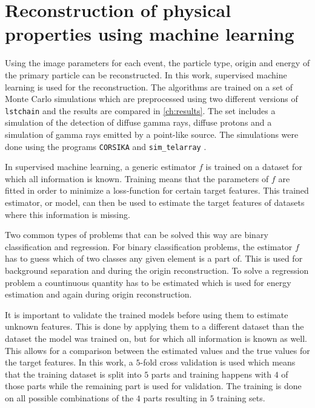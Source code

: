 \chapter{Reconstruction of physical properties using machine learning}
\label{ch:ml}
Using the image parameters for each event, the particle type, origin and energy of the primary particle can be reconstructed.
In this work, supervised machine learning is used for the reconstruction.
The algorithms are trained on a set of Monte Carlo simulations which are preprocessed using two different versions of \texttt{lstchain} 
and the results are compared in \autoref{ch:results}.
The set includes a simulation of the detection of diffuse gamma rays, diffuse protons and a simulation of gamma rays emitted by a point-like source.
The simulations were done using the programs \texttt{CORSIKA} and \texttt{sim\_telarray} \cite{simulations}.

In supervised machine learning, a generic estimator $f$ is trained on a dataset for which all information is known.
Training means that the parameters of $f$ are fitted in order to minimize a loss-function for certain target features.
This trained estimator, or model, can then be used to estimate the target features of datasets where this information is missing.

Two common types of problems that can be solved this way are binary classification and regression. 
For binary classification problems, the estimator $f$ has to guess which of two classes any given element is a part of. 
This is used for background separation and during the origin reconstruction.
To solve a regression problem a countinuous quantity has to be estimated which is used for energy estimation and again during origin reconstruction.

It is important to validate the trained models before using them to estimate unknown features.
This is done by applying them to a different dataset than the dataset the model was trained on, but for which all information is known as well.
This allows for a comparison between the estimated values and the true values for the target features.
In this work, a $\num{5}$-fold cross validation is used which means that the training dataset is split into $\num{5}$ parts and training happens 
with $\num{4}$ of those parts while the remaining part is used for validation. 
The training is done on all possible combinations of the $\num{4}$ parts resulting in $\num{5}$ training sets.



